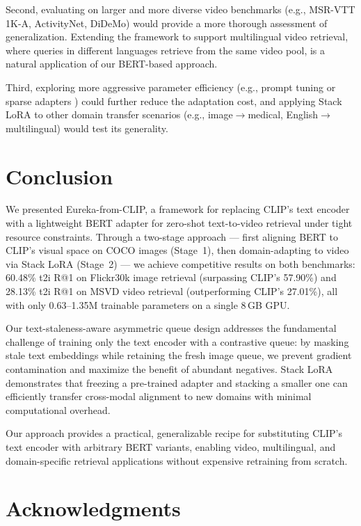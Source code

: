 \documentclass[10pt,leqno]{amsart}
\begin{document}
Second, evaluating on larger and more diverse video benchmarks (e.g., MSR-VTT 1K-A, ActivityNet, DiDeMo) would provide a more thorough assessment of generalization. Extending the framework to support multilingual video retrieval, where queries in different languages retrieve from the same video pool, is a natural application of our BERT-based approach.

Third, exploring more aggressive parameter efficiency (e.g., prompt tuning \citep{huang2023vop} or sparse adapters \citep{cao2024acl}) could further reduce the adaptation cost, and applying Stack LoRA to other domain transfer scenarios (e.g., image$\to$medical, English$\to$multilingual) would test its generality.

\section{Conclusion}

We presented Eureka-from-CLIP, a framework for replacing CLIP's text encoder with a lightweight BERT adapter for zero-shot text-to-video retrieval under tight resource constraints. Through a two-stage approach --- first aligning BERT to CLIP's visual space on COCO images (Stage~1), then domain-adapting to video via Stack LoRA (Stage~2) --- we achieve competitive results on both benchmarks: 60.48\% t2i R@1 on Flickr30k image retrieval (surpassing CLIP's 57.90\%) and 28.13\% t2i R@1 on MSVD video retrieval (outperforming CLIP's 27.01\%), all with only 0.63--1.35M trainable parameters on a single 8\,GB GPU.

Our text-staleness-aware asymmetric queue design addresses the fundamental challenge of training only the text encoder with a contrastive queue: by masking stale text embeddings while retaining the fresh image queue, we prevent gradient contamination and maximize the benefit of abundant negatives. Stack LoRA demonstrates that freezing a pre-trained adapter and stacking a smaller one can efficiently transfer cross-modal alignment to new domains with minimal computational overhead.

Our approach provides a practical, generalizable recipe for substituting CLIP's text encoder with arbitrary BERT variants, enabling video, multilingual, and domain-specific retrieval applications without expensive retraining from scratch.

\section*{Acknowledgments}
\end{document}
